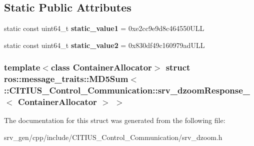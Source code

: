 \subsection*{\-Static \-Public \-Attributes}
\begin{DoxyCompactItemize}
\item 
\hypertarget{structros_1_1message__traits_1_1_m_d5_sum_3_01_1_1_c_i_t_i_u_s___control___communication_1_1srv_16d2f033488123f9178b01919fb11e57_afa1875b0d35abc3a4dc2a4ccd64f23df}{static const uint64\-\_\-t {\bfseries static\-\_\-value1} = 0xe2cc9e9d8c464550\-U\-L\-L}\label{structros_1_1message__traits_1_1_m_d5_sum_3_01_1_1_c_i_t_i_u_s___control___communication_1_1srv_16d2f033488123f9178b01919fb11e57_afa1875b0d35abc3a4dc2a4ccd64f23df}

\item 
\hypertarget{structros_1_1message__traits_1_1_m_d5_sum_3_01_1_1_c_i_t_i_u_s___control___communication_1_1srv_16d2f033488123f9178b01919fb11e57_ab1f6bd5827bb4109a84296da375edef7}{static const uint64\-\_\-t {\bfseries static\-\_\-value2} = 0x830df49c160979ad\-U\-L\-L}\label{structros_1_1message__traits_1_1_m_d5_sum_3_01_1_1_c_i_t_i_u_s___control___communication_1_1srv_16d2f033488123f9178b01919fb11e57_ab1f6bd5827bb4109a84296da375edef7}

\end{DoxyCompactItemize}
\subsubsection*{template$<$class Container\-Allocator$>$ struct ros\-::message\-\_\-traits\-::\-M\-D5\-Sum$<$ \-::\-C\-I\-T\-I\-U\-S\-\_\-\-Control\-\_\-\-Communication\-::srv\-\_\-dzoom\-Response\-\_\-$<$ Container\-Allocator $>$ $>$}



\-The documentation for this struct was generated from the following file\-:\begin{DoxyCompactItemize}
\item 
srv\-\_\-gen/cpp/include/\-C\-I\-T\-I\-U\-S\-\_\-\-Control\-\_\-\-Communication/srv\-\_\-dzoom.\-h\end{DoxyCompactItemize}
